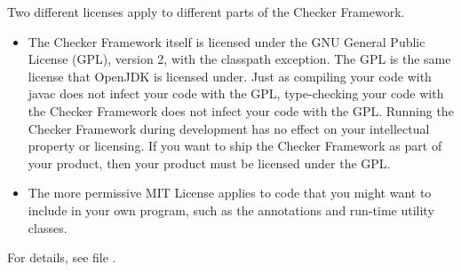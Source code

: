 Two different licenses apply to different parts of the Checker Framework.
\begin{itemize}
\item
The Checker Framework itself is licensed under the GNU General Public License
(GPL), version 2, with the classpath exception.
The GPL is the same license that OpenJDK is licensed
under.  Just as compiling your code with javac does not infect your code
with the GPL, type-checking your code with the Checker Framework does not
infect your code with the GPL\@.  Running the Checker Framework during
development has no effect on your intellectual property or licensing.  If
you want to ship the Checker Framework as part of your product, then your
product must be licensed under the GPL\@.
\item
The more permissive MIT License applies
to code that you might want to include in your own
program, such as the annotations and run-time utility classes.
\end{itemize}
\noindent
For details, see file
.



